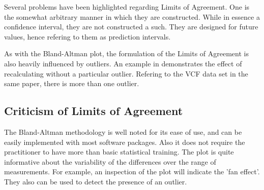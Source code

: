 \documentclass[12pt, a4paper]{report}
\theoremstyle{plain}
\theoremstyle{definition}
\theoremstyle{remark}
\begin{document}
Several problems have been highlighted regarding Limits of
Agreement. One is the somewhat arbitrary manner in which they are
constructed. While in essence a confidence interval, they are not
constructed a such. They are designed for future values, hence \citet{BXC2008} refering to them as prediction intervals.

As with the Bland-Altman plot, the formulation of the Limits of Agreement is also heavily influenced by outliers. An example
in \citet*{BA83} demonstrates the effect of recalculating without
a particular outlier. Refering to the VCF data set in the same
paper, there is more than one outlier.








\subsection{Criticism of Limits of Agreement }
The Bland-Altman methodology is well noted for its ease of use,
and can be easily implemented with most software packages. Also it
does not require the practitioner to have more than basic
statistical training. The plot is quite informative about the
variability of the differences over the range of measurements. For
example, an inspection of the plot will indicate the 'fan effect'.
They also can be used to detect the presence of an outlier.
\end{document}
